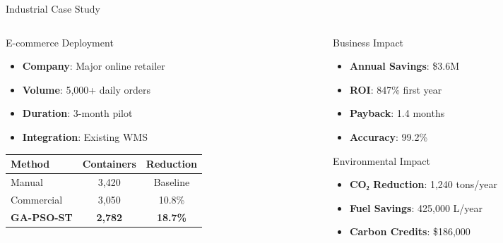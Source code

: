 \documentclass[aspectratio=169,12pt]{beamer}
\begin{document}
\begin{frame}{Industrial Case Study}
\begin{columns}[T]
\begin{column}{0.5\textwidth}
\begin{exampleblock}{E-commerce Deployment}
\begin{itemize}
    \item \textbf{Company}: Major online retailer
    \item \textbf{Volume}: 5,000+ daily orders
    \item \textbf{Duration}: 3-month pilot
    \item \textbf{Integration}: Existing WMS
\end{itemize}
\end{exampleblock}

\begin{center}
\setlength{\tabcolsep}{3pt} %
\begin{tabular}{lcc}
\toprule
\textbf{Method} & \textbf{Containers} & \textbf{Reduction} \\
\midrule
Manual & 3,420 & Baseline \\
Commercial & 3,050 & 10.8\% \\
\rowcolor{primary!20}
\textbf{GA-PSO-ST} & \textbf{2,782} & \textbf{18.7\%} \\
\bottomrule
\end{tabular}
\end{center}

\end{column}
\begin{column}{0.5\textwidth}
\begin{block}{Business Impact}
\begin{itemize}
    \item \textbf{Annual Savings}: \$3.6M
    \item \textbf{ROI}: 847\% first year
    \item \textbf{Payback}: 1.4 months
    \item \textbf{Accuracy}: 99.2\%
\end{itemize}
\end{block}

\begin{exampleblock}{Environmental Impact}
\begin{itemize}
    \item \textbf{CO₂ Reduction}: 1,240 tons/year
    \item \textbf{Fuel Savings}: 425,000 L/year
    \item \textbf{Carbon Credits}: \$186,000
\end{itemize}
\end{exampleblock}
\end{column}
\end{columns}
\end{frame}
\end{document}
